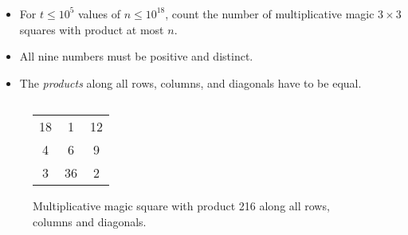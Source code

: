 \begin{frame}
    \frametitle{\problemtitle}

    \begin{columns}
        \begin{column}[T]{.62\textwidth}
            \begin{itemize}
                \item For $t\leq 10^5$ values of $n\leq 10^{18}$,
                    count the number of multiplicative magic $3\times 3$ squares with product at most $n$.
                \item All nine numbers must be positive and distinct.
                \item The \emph{products} along all rows, columns, and diagonals have to be equal.
            \end{itemize}


        \end{column}


    \end{columns}

    \vspace{1em}
    \begin{figure}
      \centering
      \begin{tabular}{c c c}
        18 & 1 & 12 \\
        4 & 6 & 9 \\
        3 & 36 & 2 
      \end{tabular}
      \caption{Multiplicative magic square with product 216 along all rows, columns and diagonals.}
    \end{figure}

\end{frame}
